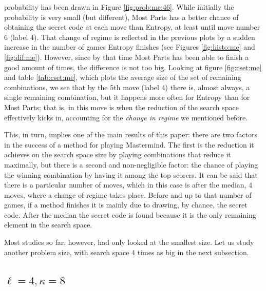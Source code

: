 \documentclass[preprint,12pt]{elsarticle}
\begin{document}
probability has been drawn in Figure \ref{fig:prob:me:46}. While
initially the probability is very small (but different), Most Parts
has a better chance of obtaining the secret code at each move than
Entropy, at least until move number 6 (label 4). That change of regime
is reflected in the previous plots by a sudden increase in the number
of games Entropy finishes (see Figures \ref{fig:histo:me} and
\ref{fig:dif:me}). However, since by that time Most Parts has been
able to finish a good amount of times, the difference is not too
big. Looking at figure \ref{fig:cset:me} and table \ref{tab:cset:me}, which plots the average size
of the set of remaining combinations, we see that by the 5th move
(label 4) there is, almost always, a single remaining combination, but
it happens more often for Entropy than for Most Parts; that is, in
this move is when the reduction of the search space effectively kicks
in, accounting for the {\em change in regime} we mentioned before. 

This, in turn, implies one of the main results of this paper: 
there are two factors in the success of a method for playing Mastermind. The
first is the reduction it achieves on the search space size by playing
combinations that reduce it maximally, but there is a second and
non-negligible factor: the chance of playing the winning
combination by having it among the top scorers. It can be said that
there is a particular number of moves, which in this case is after the
median, 4 moves, where a change of regime takes place. Before and up to 
that number of games, if a method finishes it is mainly due to
drawing, by chance, the secret code. After the median the secret code
is found because it is the only remaining element in the search
space. 

Most studies so far, however, had only looked at the smallest
size. Let us study another problem size, with search space 4 times as
big in the next subsection.

\subsection{$\ell=4,\kappa=8$}
\label{ss:k8}
\end{document}
